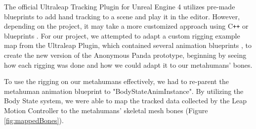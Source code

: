 The official Ultraleap Tracking Plugin for Unreal Engine 4 utilizes pre-made blueprints to add hand tracking to a scene and play it in the editor. However, depending on the project, it may take a more customized approach using C\texttt{+}\texttt{+} or blueprints \cite{ULTGIT}. For our project, we attempted to adapt a custom rigging example map from the Ultraleap Plugin, which contained several animation blueprints \cite{LEAPMOD}, to create the new version of the Anonymous Panda prototype, beginning by seeing how each rigging was done and how we could adapt it to our metahumans' bones.

To use the rigging on our metahumans effectively, we had to re-parent the metahuman animation blueprint to "BodyStateAnimInstance". By utilizing the Body State system, we were able to map the tracked data collected by the Leap Motion Controller to the metahumans' skeletal mesh bones (Figure \ref{fig:mappedBones}).

